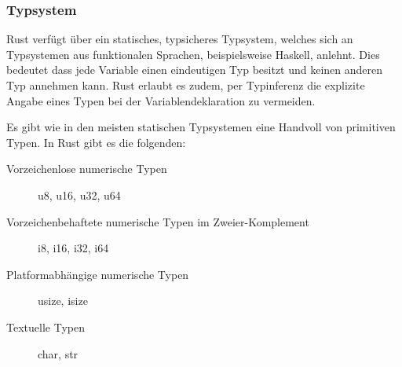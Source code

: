 




\subsubsection{Typsystem}

Rust verfügt über ein statisches, typsicheres Typsystem, welches sich an Typsystemen aus funktionalen Sprachen, beispielsweise Haskell, anlehnt\cite{rustWikiDe}. Dies bedeutet dass jede Variable einen eindeutigen Typ besitzt und keinen
anderen Typ annehmen kann. Rust erlaubt es zudem, per Typinferenz die explizite Angabe eines Typen bei der Variablendeklaration zu
vermeiden\cite{rustWikiDe}.

Es gibt wie in den meisten statischen Typsystemen eine Handvoll von primitiven Typen. In Rust gibt es die folgenden\cite{rustTypes}:

\begin{description}
	\item[Vorzeichenlose numerische Typen] u8, u16, u32, u64
	\item[Vorzeichenbehaftete numerische Typen im Zweier-Komplement] i8, i16, i32, i64
	\item[Platformabhängige numerische Typen] usize, isize
	\item[Textuelle Typen] char, str
\end{description}

